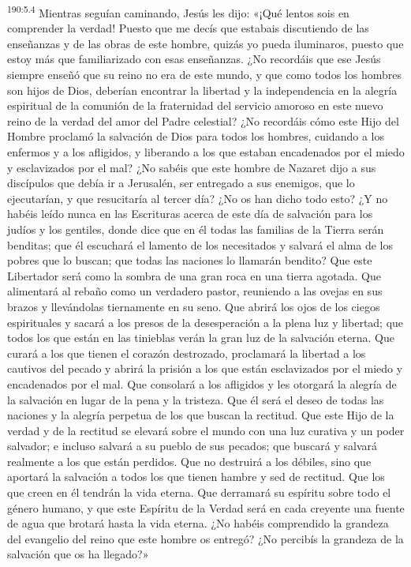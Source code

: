 \par 
\textsuperscript{190:5.4} Mientras seguían caminando, Jesús les dijo: «¡Qué lentos sois en comprender la verdad! Puesto que me decís que estabais discutiendo de las enseñanzas y de las obras de este hombre, quizás yo pueda iluminaros, puesto que estoy más que familiarizado con esas enseñanzas. ¿No recordáis que ese Jesús siempre enseñó que su reino no era de este mundo, y que como todos los hombres son hijos de Dios, deberían encontrar la libertad y la independencia en la alegría espiritual de la comunión de la fraternidad del servicio amoroso en este nuevo reino de la verdad del amor del Padre celestial? ¿No recordáis cómo este Hijo del Hombre proclamó la salvación de Dios para todos los hombres, cuidando a los enfermos y a los afligidos, y liberando a los que estaban encadenados por el miedo y esclavizados por el mal? ¿No sabéis que este hombre de Nazaret dijo a sus discípulos que debía ir a Jerusalén, ser entregado a sus enemigos, que lo ejecutarían, y que resucitaría al tercer día? ¿No os han dicho todo esto? ¿Y no habéis leído nunca en las Escrituras acerca de este día de salvación para los judíos y los gentiles, donde dice que en él todas las familias de la Tierra serán benditas; que él escuchará el lamento de los necesitados y salvará el alma de los pobres que lo buscan; que todas las naciones lo llamarán bendito? Que este Libertador será como la sombra de una gran roca en una tierra agotada. Que alimentará al rebaño como un verdadero pastor, reuniendo a las ovejas en sus brazos y llevándolas tiernamente en su seno. Que abrirá los ojos de los ciegos espirituales y sacará a los presos de la desesperación a la plena luz y libertad; que todos los que están en las tinieblas verán la gran luz de la salvación eterna. Que curará a los que tienen el corazón destrozado, proclamará la libertad a los cautivos del pecado y abrirá la prisión a los que están esclavizados por el miedo y encadenados por el mal. Que consolará a los afligidos y les otorgará la alegría de la salvación en lugar de la pena y la tristeza. Que él será el deseo de todas las naciones y la alegría perpetua de los que buscan la rectitud. Que este Hijo de la verdad y de la rectitud se elevará sobre el mundo con una luz curativa y un poder salvador; e incluso salvará a su pueblo de sus pecados; que buscará y salvará realmente a los que están perdidos. Que no destruirá a los débiles, sino que aportará la salvación a todos los que tienen hambre y sed de rectitud. Que los que creen en él tendrán la vida eterna. Que derramará su espíritu sobre todo el género humano, y que este Espíritu de la Verdad será en cada creyente una fuente de agua que brotará hasta la vida eterna. ¿No habéis comprendido la grandeza del evangelio del reino que este hombre os entregó? ¿No percibís la grandeza de la salvación que os ha llegado?»

